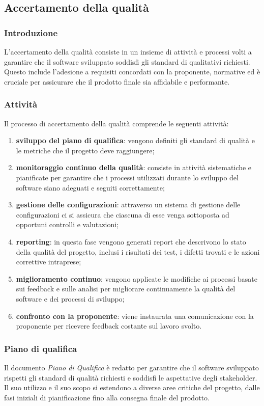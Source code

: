 \subsection{Accertamento della qualità}
\subsubsection{Introduzione}
L'accertamento della qualità consiste in un insieme di attività e processi volti a garantire che il software sviluppato soddisfi gli standard di qualitativi richiesti. Questo include l'adesione a requisiti concordati con la proponente, normative ed è cruciale per assicurare che il prodotto finale sia affidabile e performante.

\subsubsection{Attività}
Il processo di accertamento della qualità comprende le seguenti attività:
\begin{enumerate}
	\item \textbf{sviluppo del piano di qualifica}: vengono definiti gli standard di qualità e le metriche che il progetto deve raggiungere;
	\item \textbf{monitoraggio continuo della qualità}: consiste in attività sistematiche e pianificate per garantire che i processi utilizzati durante lo sviluppo del software siano adeguati e seguiti correttamente;
	\item \textbf{gestione delle configurazioni}: attraverso un sistema di gestione delle configurazioni ci si assicura che ciascuna di esse venga sottoposta ad opportuni controlli e valutazioni;
	\item \textbf{reporting}: in questa fase vengono generati report che descrivono lo stato della qualità del progetto, inclusi i risultati dei test, i difetti trovati e le azioni correttive intraprese;
	\item \textbf{miglioramento continuo}: vengono applicate le modifiche ai processi basate sui feedback e sulle analisi per migliorare continuamente la qualità del software e dei processi di sviluppo;
	\item \textbf{confronto con la proponente}: viene instaurata una comunicazione con la proponente per ricevere feedback costante sul lavoro svolto.
\end{enumerate}

\subsubsection{Piano di qualifica}
Il documento \textit{Piano di Qualifica} è redatto per garantire che il software sviluppato rispetti gli standard di qualità richiesti e soddisfi le aspettative degli stakeholder. Il suo utilizzo e il suo scopo si estendono a diverse aree critiche del progetto, dalle fasi iniziali di pianificazione fino alla consegna finale del prodotto.

